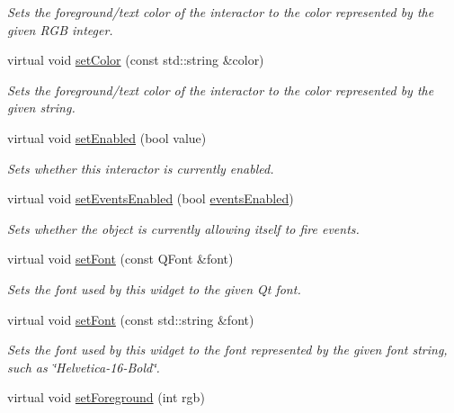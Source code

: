 \begin{DoxyCompactItemize}
\begin{DoxyCompactList}\small\item\em Sets the foreground/text color of the interactor to the color represented by the given R\+GB integer. \end{DoxyCompactList}\item 
virtual void \mbox{\hyperlink{classGInteractor_a61374df6c11b52cfbb0815decdbaebc6}{set\+Color}} (const std\+::string \&color)
\begin{DoxyCompactList}\small\item\em Sets the foreground/text color of the interactor to the color represented by the given string. \end{DoxyCompactList}\item 
virtual void \mbox{\hyperlink{classGInteractor_ab831367dd84bbd579e02e55bacb21343}{set\+Enabled}} (bool value)
\begin{DoxyCompactList}\small\item\em Sets whether this interactor is currently enabled. \end{DoxyCompactList}\item 
virtual void \mbox{\hyperlink{classGObservable_afaa30b2a9e0f378fd1c70d2f1d0b8216}{set\+Events\+Enabled}} (bool \mbox{\hyperlink{classGInteractor_ac05ba5b92e2e5146d416fe7f842a0969}{events\+Enabled}})
\begin{DoxyCompactList}\small\item\em Sets whether the object is currently allowing itself to fire events. \end{DoxyCompactList}\item 
virtual void \mbox{\hyperlink{classGInteractor_a2592348886ffea646c6534bf88f7c49d}{set\+Font}} (const Q\+Font \&font)
\begin{DoxyCompactList}\small\item\em Sets the font used by this widget to the given Qt font. \end{DoxyCompactList}\item 
virtual void \mbox{\hyperlink{classGInteractor_a8e096e8818d838aceae1d46d58fb3a7b}{set\+Font}} (const std\+::string \&font)
\begin{DoxyCompactList}\small\item\em Sets the font used by this widget to the font represented by the given font string, such as \char`\"{}\+Helvetica-\/16-\/\+Bold\char`\"{}. \end{DoxyCompactList}\item 
virtual void \mbox{\hyperlink{classGInteractor_a9eb856b5ff83a19df3831a31f15f4563}{set\+Foreground}} (int rgb)

\end{DoxyCompactItemize}
